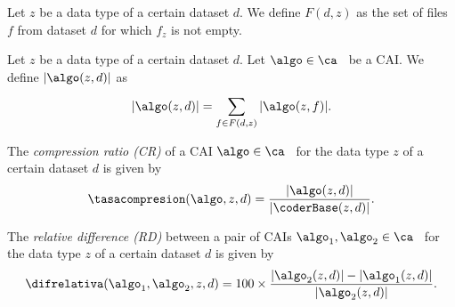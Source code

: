 \vspace{+5pt}
\begin{defcion}
\label{eq:coding-size-dataset}
Let $z$ be a data type of a certain dataset $d$. We define $F(d, z)$ as the set of files $f$ from dataset $d$ for which $f_z$ is not empty.
\end{defcion}


\begin{defcion}
Let $z$ be a data type of a certain dataset $d$. Let $\algo \in \ca$ \ be a CAI. We define $|\algo(z, d)|$ as
\vspace{-5pt}
\begin{equation}
\label{eq:dataset-size}
|\algo(z, d)|  = \sum_{f \in F(d, z)}^{} |\algo(z, f)|.
\end{equation}
\end{defcion}


\vspace{+3pt}
\begin{defcion}
The \textit{compression ratio (CR)} of a CAI $\algo \in \ca$ \ for the data type $z$ of a certain dataset $d$ is given by
\vspace{-5pt}
\begin{equation}
\label{eq:compression-rate-dataset}
\tasacompresion(\algo, z, d) = \frac{|\algo(z, d)|}{|\coderBase(z, d)|}.
\end{equation}
\end{defcion}


\vspace{+3pt}
\begin{defcion}
\label{def:relative-difference-dataset}
The \textit{relative difference (RD)} between a pair of CAIs $\algo_1, \algo_2 \in {\ca}$ \ for the data type $z$ of a certain dataset $d$ is given by
\vspace{-5pt}
\begin{equation}
\label{eq:relative-difference-dataset}
\difrelativa(\algo_1, \algo_2, z, d)  =
100\times\frac{|\algo_2 (z, d)| - |\algo_1 (z, d)|}{ |\algo_2 (z, d)| }.
\end{equation}
\end{defcion}


\clearpage

